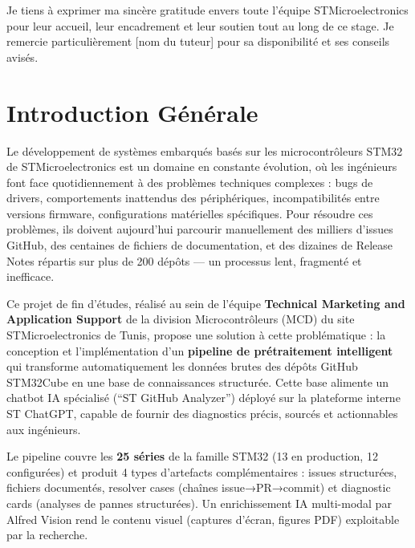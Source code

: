 \documentclass[12pt,a4paper]{report}
\begin{document}
Je tiens à exprimer ma sincère gratitude envers toute l'équipe STMicroelectronics pour leur accueil, leur encadrement et leur soutien tout au long de ce stage. Je remercie particulièrement [nom du tuteur] pour sa disponibilité et ses conseils avisés.

\newpage
\tableofcontents
\newpage
\listoffigures
\newpage

\chapter*{Introduction Générale}

Le développement de systèmes embarqués basés sur les microcontrôleurs STM32 de STMicroelectronics est un domaine en constante évolution, où les ingénieurs font face quotidiennement à des problèmes techniques complexes : bugs de drivers, comportements inattendus des périphériques, incompatibilités entre versions firmware, configurations matérielles spécifiques. Pour résoudre ces problèmes, ils doivent aujourd'hui parcourir manuellement des milliers d'issues GitHub, des centaines de fichiers de documentation, et des dizaines de Release Notes répartis sur plus de 200 dépôts --- un processus lent, fragmenté et inefficace.

Ce projet de fin d'études, réalisé au sein de l'équipe \textbf{Technical Marketing and Application Support} de la division Microcontrôleurs (MCD) du site STMicroelectronics de Tunis, propose une solution à cette problématique : la conception et l'implémentation d'un \textbf{pipeline de prétraitement intelligent} qui transforme automatiquement les données brutes des dépôts GitHub STM32Cube en une base de connaissances structurée. Cette base alimente un chatbot IA spécialisé (``ST GitHub Analyzer'') déployé sur la plateforme interne ST ChatGPT, capable de fournir des diagnostics précis, sourcés et actionnables aux ingénieurs.

Le pipeline couvre les \textbf{25 séries} de la famille STM32 (13 en production, 12 configurées) et produit 4 types d'artefacts complémentaires : issues structurées, fichiers documentés, resolver cases (chaînes issue→PR→commit) et diagnostic cards (analyses de pannes structurées). Un enrichissement IA multi-modal par Alfred Vision rend le contenu visuel (captures d'écran, figures PDF) exploitable par la recherche.
\end{document}

